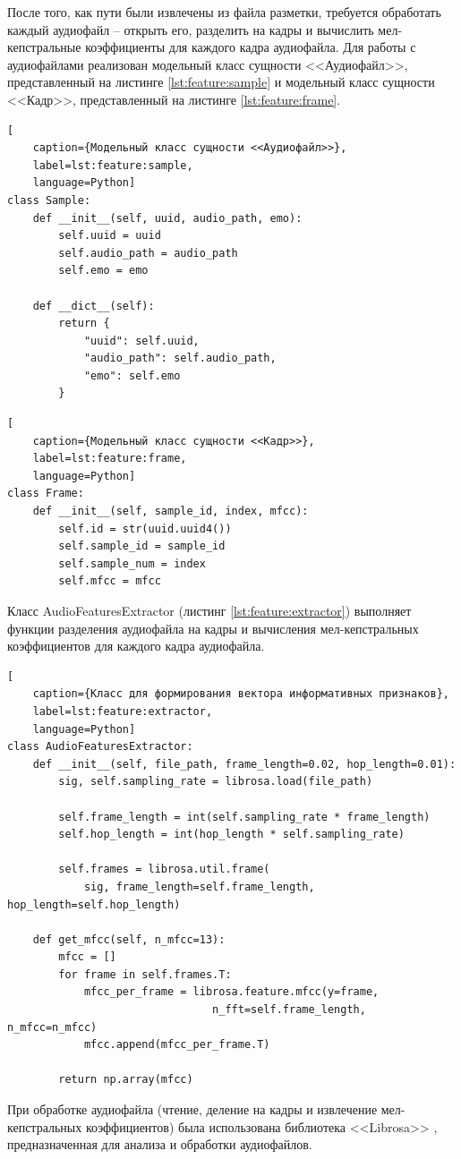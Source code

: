 После того, как пути были извлечены из файла разметки, требуется обработать каждый аудиофайл -- открыть его, разделить на кадры и вычислить мел-кепстральные коэффициенты для каждого кадра аудиофайла. Для работы с аудиофайлами реализован модельный класс сущности <<Аудиофайл>>, представленный на листинге \ref{lst:feature:sample} и модельный класс сущности <<Кадр>>, представленный на листинге \ref{lst:feature:frame}.
\begin{lstlisting}[
	caption={Модельный класс сущности <<Аудиофайл>>},
	label=lst:feature:sample,
	language=Python]
class Sample:
    def __init__(self, uuid, audio_path, emo):
        self.uuid = uuid
        self.audio_path = audio_path
        self.emo = emo

    def __dict__(self):
        return {
            "uuid": self.uuid,
            "audio_path": self.audio_path,
            "emo": self.emo
        }
\end{lstlisting}

\begin{lstlisting}[
	caption={Модельный класс сущности <<Кадр>>},
	label=lst:feature:frame,
	language=Python]
class Frame:
    def __init__(self, sample_id, index, mfcc):
        self.id = str(uuid.uuid4())
        self.sample_id = sample_id
        self.sample_num = index
        self.mfcc = mfcc
\end{lstlisting}

Класс AudioFeaturesExtractor (листинг \ref{lst:feature:extractor}) выполняет функции разделения аудиофайла на кадры и вычисления мел-кепстральных коэффициентов для каждого кадра аудиофайла.
\begin{lstlisting}[
	caption={Класс для формирования вектора информативных признаков},
	label=lst:feature:extractor,
	language=Python]
class AudioFeaturesExtractor:
    def __init__(self, file_path, frame_length=0.02, hop_length=0.01):
        sig, self.sampling_rate = librosa.load(file_path)

        self.frame_length = int(self.sampling_rate * frame_length)
        self.hop_length = int(hop_length * self.sampling_rate)

        self.frames = librosa.util.frame(
        	sig, frame_length=self.frame_length, hop_length=self.hop_length)

    def get_mfcc(self, n_mfcc=13):
        mfcc = []
        for frame in self.frames.T:
            mfcc_per_frame = librosa.feature.mfcc(y=frame, 
            					n_fft=self.frame_length, n_mfcc=n_mfcc)
            mfcc.append(mfcc_per_frame.T)

        return np.array(mfcc)
\end{lstlisting}
При обработке аудиофайла (чтение, деление на кадры и извлечение мел-кепстральных коэффициентов) была использована библиотека <<Librosa>> \cite{librosa}, предназначенная для анализа и обработки аудиофайлов. 

